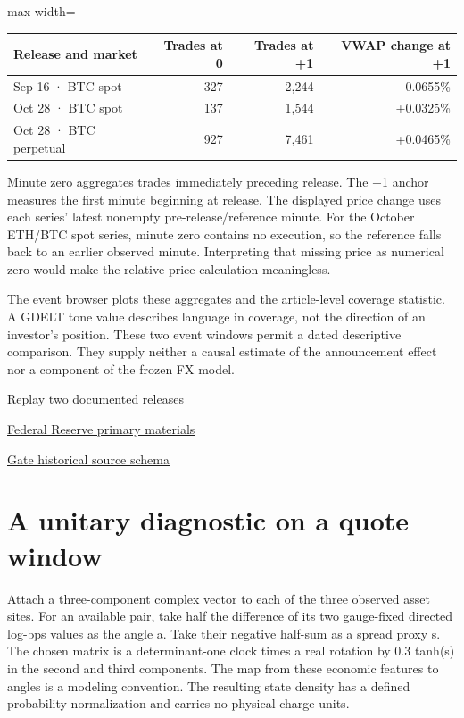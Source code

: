 \documentclass[11pt,oneside,openany]{book}
\begin{document}
\begin{center}\footnotesize\sffamily\setlength{\tabcolsep}{3.5pt}\renewcommand{\arraystretch}{1.2}
\begin{adjustbox}{max width=\linewidth}\begin{tabular}{@{}lrrr@{}}\toprule
Release and market & Trades at 0 & Trades at +1 & VWAP change at +1 \\ \midrule
Sep 16 · BTC spot & 327 & 2,244 & \ensuremath{-}0.0655\% \\
Oct 28 · BTC spot & 137 & 1,544 & +0.0325\% \\
Oct 28 · BTC perpetual & 927 & 7,461 & +0.0465\% \\
\bottomrule\end{tabular}\end{adjustbox}\end{center}
Minute zero aggregates trades immediately preceding release. The +1 anchor measures the first minute beginning at release. The displayed price change uses each series’ latest nonempty pre-release/reference minute. For the October ETH/BTC spot series, minute zero contains no execution, so the reference falls back to an earlier observed minute. Interpreting that missing price as numerical zero would make the relative price calculation meaningless.

The event browser plots these aggregates and the article-level coverage statistic. A GDELT tone value describes language in coverage, not the direction of an investor’s position. These two event windows permit a dated descriptive comparison. They supply neither a causal estimate of the announcement effect nor a component of the frozen FX model.

{\small\sffamily\href{https://amelie-iska.github.io/phaseweave-lab/events.html}{Replay two documented releases}\par}
{\small\sffamily\href{https://www.federalreserve.gov/monetarypolicy/materials/}{Federal Reserve primary materials}\par}
{\small\sffamily\href{https://www.gate.com/uk/announcements/article/21688/}{Gate historical source schema}\par}
\section*{A unitary diagnostic on a quote window}
Attach a three-component complex vector to each of the three observed asset sites. For an available pair, take half the difference of its two gauge-fixed directed log-bps values as the angle a. Take their negative half-sum as a spread proxy s. The chosen matrix is a determinant-one clock times a real rotation by 0.3 tanh(s) in the second and third components. The map from these economic features to angles is a modeling convention. The resulting state density has a defined probability normalization and carries no physical charge units.
\end{document}
